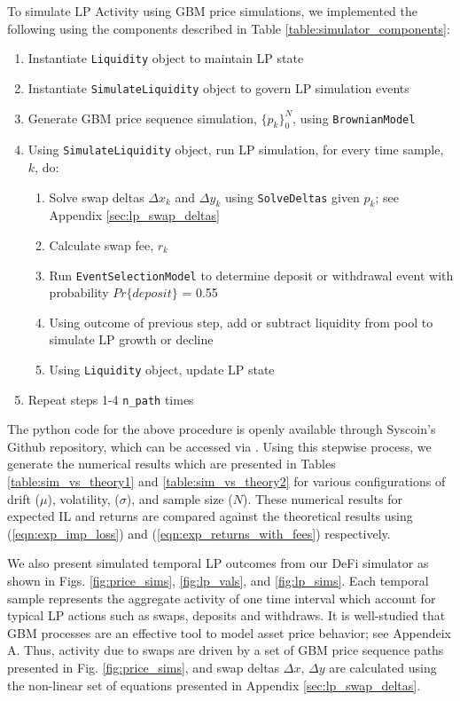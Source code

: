 \documentclass[journal,twocolumn,12pt]{ieeesyscoin}
\begin{document}
To simulate LP Activity using GBM price simulations, we implemented the following using the components described in Table \ref{table:simulator_components}: 
\begin{enumerate}
	\item Instantiate \verb|Liquidity| object to maintain LP state 
	\item Instantiate \verb|SimulateLiquidity| object to govern LP simulation events
	\item Generate GBM price sequence simulation, $\{p_{k}\}_{0}^{N}$, using \verb|BrownianModel|
	\item Using \verb|SimulateLiquidity| object, run LP simulation, for every time sample, $k$, do:
  \begin{enumerate}
    \item Solve swap deltas $\Delta x_{k}$ and $\Delta y_{k}$ using \verb|SolveDeltas| given $p_{k}$; see Appendix \ref{sec:lp_swap_deltas}
    \item Calculate swap fee, $r_{k}$
    \item Run \verb|EventSelectionModel| to determine deposit or withdrawal event with probability $Pr\{deposit\}$ = 0.55
    \item Using outcome of previous step, add or subtract liquidity from pool to simulate LP growth or decline
    \item Using \verb|Liquidity| object, update LP state 
  \end{enumerate}
  \item Repeat steps 1-4 \verb|n_path| times
	
\end{enumerate}
The python code for the above procedure is openly available through Syscoin's Github repository, which can be accessed via \cite{DAOSim23}. Using this stepwise process, we generate the numerical results which are presented in Tables \ref{table:sim_vs_theory1} and \ref{table:sim_vs_theory2} for various configurations of drift ($\mu$), volatility, ($\sigma$), and sample size ($N$). These numerical results for expected IL and returns are compared against the theoretical results using (\ref{eqn:exp_imp_loss}) and (\ref{eqn:exp_returns_with_fees}) respectively.

We also present simulated temporal LP outcomes from our DeFi simulator as shown in Figs. \ref{fig:price_sims}, \ref{fig:lp_vals}, and \ref{fig:lp_sims}. Each temporal sample represents the aggregate activity of one time interval which account for typical LP actions such as swaps, deposits and withdraws. It is well-studied that GBM processes are an effective tool to model asset price behavior; see Appendeix A. Thus, activity due to swaps are driven by a set of GBM price sequence paths presented in Fig. \ref{fig:price_sims}, and swap deltas $\Delta x$, $\Delta y$ are calculated using the non-linear set of equations presented in Appendix \ref{sec:lp_swap_deltas}. 
\end{document}
